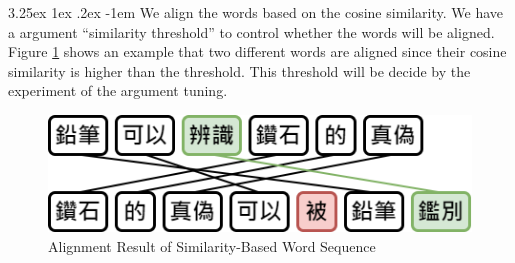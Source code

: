 \documentclass[12pt]{article}
\makeatletter
\renewcommand\paragraph{\@startsection{paragraph}{5}{\z@}%
  {3.25ex \@plus1ex \@minus.2ex}%
  {-1em}%
  {\normalfont\normalsize\bfseries}}
\makeatother
\begin{document}
\begin{CJK*}{UTF8}{bkai}
\begin{spacing}{1.77}

\paragraph{}
We align the words based on the cosine similarity. We have a argument ``similarity threshold'' to control whether the words will be aligned. Figure \ref{fig:sim_threshold} shows an example that two different words are aligned since their cosine similarity is higher than the threshold. This threshold will be decide by the experiment of the argument tuning.

\hspace*{-1.5in}
\begin{figure}[H]
  \centering
  \includegraphics[scale=0.6]{Threshold.png}
  \caption{Alignment Result of Similarity-Based Word Sequence}
  \label{fig:sim_threshold}
\end{figure}



\end{spacing}
\end{CJK*}
\end{document}
